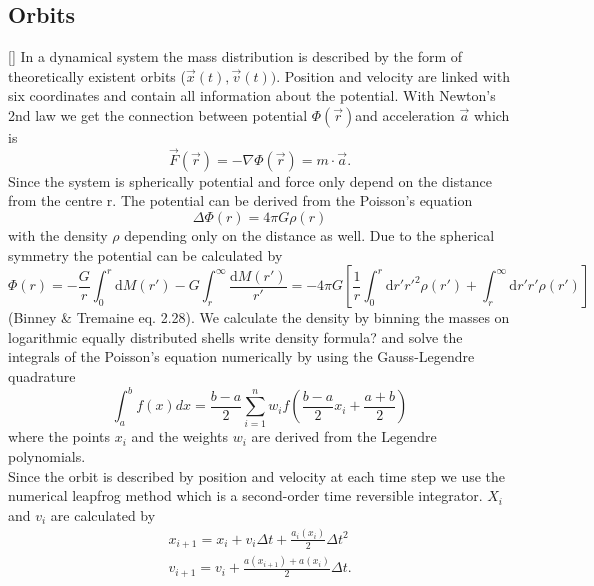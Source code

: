 \documentclass[a4paper,12pt,abstracton]{scrartcl}
\begin{document}
\subsection{Orbits}[\label{sec2.2}]
In a dynamical system the mass distribution is described by the form of theoretically existent orbits (\(\vec{x}(t),\vec{v}(t))\). Position and velocity are linked with six coordinates and contain all information about the potential. With Newton's 2nd law we get the connection between potential \(\Phi(\vec{r})\)and acceleration \(\vec{a}\) which is \[\vec{F}(\vec{r})=-\nabla\Phi(\vec{r})=m\cdot\vec{a}.\] Since the system is spherically potential and force only depend on the distance from the centre r. The potential can be derived from the Poisson's equation \begin{equation}
\Delta\Phi(r)=4\pi G \rho(r)
\end{equation}
with the density \(\rho\) depending only on the distance as well. Due to the spherical symmetry the potential can be calculated by 
\begin{equation}
\Phi(r)=-\frac{G}{r}\int_0^r{\mathrm{d}M(r')}-G\int_r^{\infty}{\frac{\mathrm{d}M(r')}{r'}}=-4\pi G\left[\frac{1}{r}\int_0^r\mathrm{d}r'r'^2\rho(r')+\int_r^{\infty}\mathrm{d}r'r'\rho(r')\right]
\end{equation} (Binney \& Tremaine eq. 2.28). We calculate the density by binning the masses on logarithmic equally distributed shells \color{red} write density formula? \color{black} and solve the integrals of the Poisson's equation numerically by using the Gauss-Legendre quadrature \[\int_a^b f(x)dx = \frac{b-a}{2}\sum_{i=1}^n w_i f\left(\frac{b-a}{2}x_i+\frac{a+b}{2}\right)\] where the points \(x_i\) and the weights \(w_i\) are derived from the Legendre polynomials.\\ Since the orbit is described by position and velocity at each time step we use the numerical leapfrog method which is a second-order time reversible integrator. \(X_i\) and \(v_i\) are calculated by 
\begin{align*}
x_{i+1}=x_i+v_i\Delta t+\frac{a_i(x_i)}{2}\Delta t^2 \\
v_{i+1}=v_i+\frac{a(x_{i+1})+a(x_i)}{2}\Delta t.
\end{align*}
\end{document}
